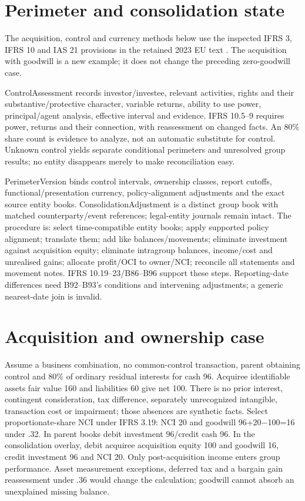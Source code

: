 \hypertarget{perimeter-and-consolidation-state}{%
\section{Perimeter and consolidation state}\label{method-groups-fx-methods-perimeter-and-consolidation-state}}

The acquisition, control and currency methods below use the inspected IFRS 3, IFRS 10 and IAS 21 provisions in the retained 2023 EU text \citep{eu20231803}. The acquisition with goodwill is a new example; it does not change the preceding zero-goodwill case.

ControlAssessment records investor/investee, relevant activities, rights and their substantive/protective character, variable returns, ability to use power, principal/agent analysis, effective interval and evidence. IFRS 10.5--9 requires power, returns and their connection, with reassessment on changed facts. An 80\% share count is evidence to analyze, not an automatic substitute for control. Unknown control yields separate conditional perimeters and unresolved group results; no entity disappears merely to make reconciliation easy.

PerimeterVersion binds control intervals, ownership classes, report cutoffs, functional/presentation currency, policy-alignment adjustments and the exact source entity books. ConsolidationAdjustment is a distinct group book with matched counterparty/event references; legal-entity journals remain intact. The procedure is: select time-compatible entity books; apply supported policy alignment; translate them; add like balances/movements; eliminate investment against acquisition equity; eliminate intragroup balances, income/cost and unrealised gains; allocate profit/OCI to owner/NCI; reconcile all statements and movement notes. IFRS 10.19--23/B86--B96 support these steps. Reporting-date differences need B92--B93's conditions and intervening adjustments; a generic nearest-date join is invalid.

\hypertarget{acquisition-and-ownership-case}{%
\section{Acquisition and ownership case}\label{method-groups-fx-methods-acquisition-and-ownership-case}}

Assume a business combination, no common-control transaction, parent obtaining control and 80\% of ordinary residual interests for cash 96. Acquiree identifiable assets fair value 160 and liabilities 60 give net 100. There is no prior interest, contingent consideration, tax difference, separately unrecognized intangible, transaction cost or impairment; those absences are synthetic facts. Select proportionate-share NCI under IFRS 3.19: NCI 20 and goodwill 96+20\ensuremath{-}100=16 under .32. In parent books debit investment 96/credit cash 96. In the consolidation overlay, debit acquiree acquisition equity 100 and goodwill 16, credit investment 96 and NCI 20. Only post-acquisition income enters group performance. Asset measurement exceptions, deferred tax and a bargain gain reassessment under .36 would change the calculation; goodwill cannot absorb an unexplained missing balance.

